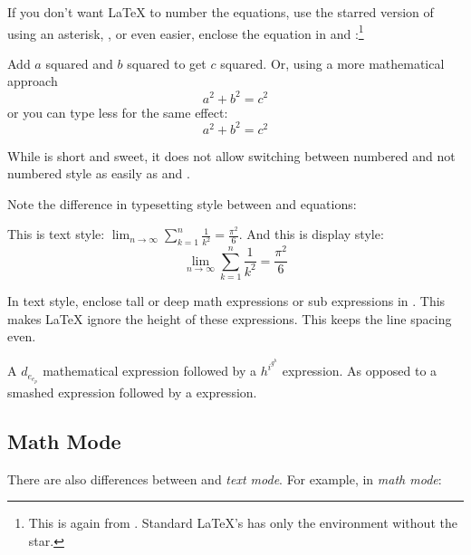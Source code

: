 If you don't want \LaTeX{} to number the equations, use the starred
version of  using an asterisk, , or even easier, enclose the
equation in \ci{[} and \ci{]}:\footnote{
  This is again from .
  Standard \LaTeX{}'s has only the  environment without the star.}
\begin{example}
Add $a$ squared and $b$ squared
to get $c$ squared. Or, using
a more mathematical approach
 \begin{equation*}
   a^2 + b^2 = c^2
 \end{equation*}
or you can type less for the
same effect:
 \[ a^2 + b^2 = c^2 \]
\end{example}
While \ci{[} is short and sweet, it does not allow switching between numbered and not numbered style as easily as
 and .

Note the difference in typesetting style between  and 
equations:
\begin{example}
This is text style: 
$\lim_{n \to \infty} 
 \sum_{k=1}^n \frac{1}{k^2} 
 = \frac{\pi^2}{6}$.
And this is display style:
 \begin{equation}
  \lim_{n \to \infty} 
  \sum_{k=1}^n \frac{1}{k^2} 
  = \frac{\pi^2}{6}
 \end{equation}
\end{example}

In text style, enclose tall or deep math expressions or sub
expressions in . This makes \LaTeX{} ignore the height of
these expressions. This keeps the line spacing even.

\begin{example}
A $d_{e_{e_p}}$ mathematical
expression  followed by a
$h^{i^{g^h}}$ expression. As
opposed to a smashed 
 expression 
followed by a
 expression.
\end{example}

\subsection{Math Mode}

There are also differences between \emph{} and \emph{text mode}. For
example, in \emph{math mode}:

